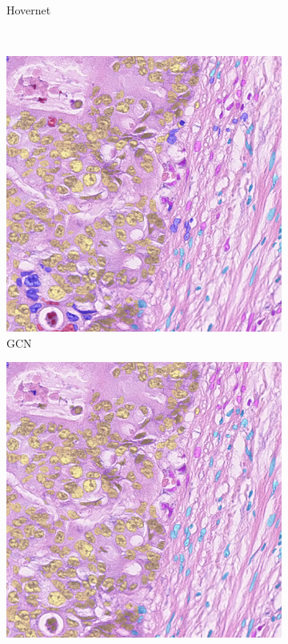 \begin{figure}[H]
\begin{subfigure}[b]{0.45\textwidth}
    \caption{Hovernet}
  \end{subfigure}
  \\
  \begin{subfigure}[b]{0.45\textwidth}
    \includegraphics[width=\textwidth]{imgs/qual/consep/gcn-full2.png}
    \caption{GCN}
  \end{subfigure}
  \hfill
  \begin{subfigure}[b]{0.45\textwidth}
    \includegraphics[width=\textwidth]{imgs/qual/consep/no-morph2.png}

\end{subfigure}
\end{figure}
